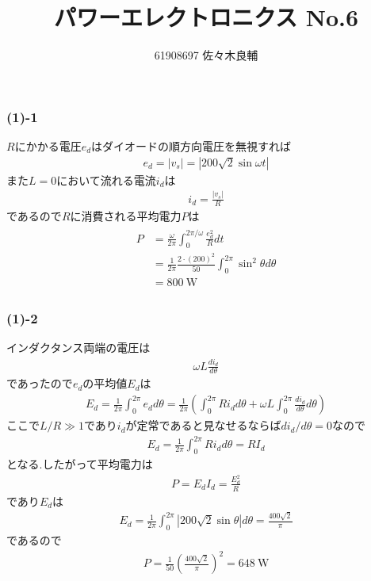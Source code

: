 \documentclass[uplatex,a4j,11pt,dvipdfmx]{jsarticle}
\begin{document}
\title{パワーエレクトロニクス No.6}
\author{61908697 佐々木良輔}
\date{}
\maketitle
\subsubsection*{(1)-1}
$R$にかかる電圧$e_d$はダイオードの順方向電圧を無視すれば
\begin{align}
  e_d=|v_s|=|200\sqrt{2}\sin\omega t|
\end{align}
また$L=0$において流れる電流$i_d$は
\begin{align}
  i_d=\frac{|v_s|}{R}
\end{align}
であるので$R$に消費される平均電力$P$は
\begin{align}
  \begin{split}
    P&=\frac{\omega}{2\pi}\int_0^{2\pi/\omega}\frac{e_d^2}{R}dt\\
    &=\frac{1}{2\pi}\frac{2\cdot(200)^2}{50}\int_0^{2\pi}\sin^2\theta d\theta\\
    &=800\ \si{\watt}
  \end{split}
\end{align}
\subsubsection*{(1)-2}
インダクタンス両端の電圧は
\begin{align}
  \omega L\frac{di_d}{d\theta}
\end{align}
であったので$e_d$の平均値$E_d$は
\begin{align}
  E_d=\frac{1}{2\pi}\int_0^{2\pi}e_d d\theta=\frac{1}{2\pi}\left(\int_0^{2\pi}Ri_dd\theta+\omega L\int_0^{2\pi}\frac{di_d}{d\theta}d\theta\right)
\end{align}
ここで$L/R\gg 1$であり$i_d$が定常であると見なせるならば$di_d/d\theta=0$なので
\begin{align}
  E_d=\frac{1}{2\pi}\int_0^{2\pi}Ri_dd\theta=RI_d
\end{align}
となる.したがって平均電力は
\begin{align}
  P=E_dI_d=\frac{E_d^2}{R}
\end{align}
であり$E_d$は
\begin{align}
  E_d=\frac{1}{2\pi}\int_0^{2\pi}|200\sqrt{2}\sin\theta|d\theta=\frac{400\sqrt{2}}{\pi}
\end{align}
であるので
\begin{align}
  P=\frac{1}{50}\left(\frac{400\sqrt{2}}{\pi}\right)^2=648\ \si{\watt}
\end{align}
\end{document}
